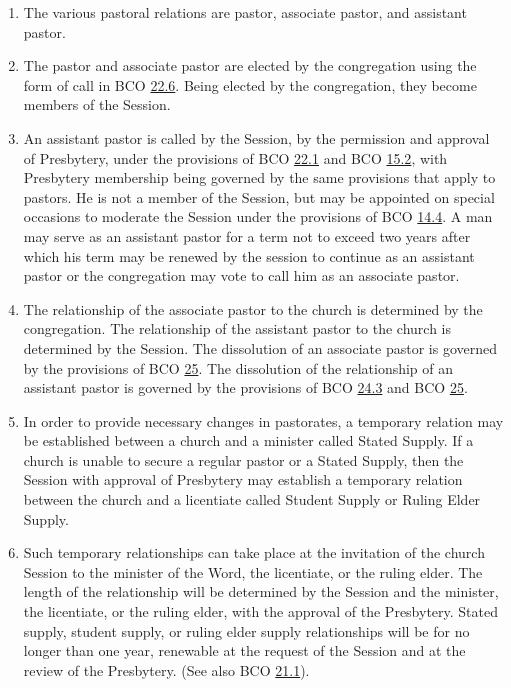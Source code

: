 \documentclass[
]{book}
\providecommand{\tightlist}{%
  \setlength{\itemsep}{0pt}\setlength{\parskip}{0pt}}
\begin{document}
\protect\hypertarget{chapter-slug-24-the-pastoral-relations}{\href{}{}}

\begin{enumerate}
\def\labelenumi{\arabic{enumi}.}
\tightlist
\item
  \protect\hypertarget{24}{\href{}{}}The various pastoral relations are pastor, associate pastor, and assistant pastor.
\item
  The pastor and associate pastor are elected by the congregation using the form of call in BCO \protect\hyperlink{22.6}{22.6}. Being elected by the congregation, they become members of the Session.
\item
  \protect\hypertarget{24.3}{\href{}{}}An assistant pastor is called by the Session, by the permission and approval of Presbytery, under the provisions of BCO \protect\hyperlink{22.1}{22.1} and BCO \protect\hyperlink{15.2}{15.2}, with Presbytery membership being governed by the same provisions that apply to pastors. He is not a member of the Session, but may be appointed on special occasions to moderate the Session under the provisions of BCO \protect\hyperlink{14.4}{14.4}. A man may serve as an assistant pastor for a term not to exceed two years after which his term may be renewed by the session to continue as an assistant pastor or the congregation may vote to call him as an associate pastor.
\item
  The relationship of the associate pastor to the church is determined by the congregation. The relationship of the assistant pastor to the church is determined by the Session. The dissolution of an associate pastor is governed by the provisions of BCO \protect\hyperlink{25}{25}. The dissolution of the relationship of an assistant pastor is governed by the provisions of BCO \protect\hyperlink{24.3}{24.3} and BCO \protect\hyperlink{25}{25}.
\item
  \protect\hypertarget{24.5}{\href{}{}}In order to provide necessary changes in pastorates, a temporary relation may be established between a church and a minister called Stated Supply. If a church is unable to secure a regular pastor or a Stated Supply, then the Session with approval of Presbytery may establish a temporary relation between the church and a licentiate called Student Supply or Ruling Elder Supply.
\item
  \protect\hypertarget{24.6}{\href{}{}}Such temporary relationships can take place at the invitation of the church Session to the minister of the Word, the licentiate, or the ruling elder. The length of the relationship will be determined by the Session and the minister, the licentiate, or the ruling elder, with the approval of the Presbytery. Stated supply, student supply, or ruling elder supply relationships will be for no longer than one year, renewable at the request of the Session and at the review of the Presbytery. (See also BCO \protect\hyperlink{21.1}{21.1}).
\end{enumerate}
\end{document}
